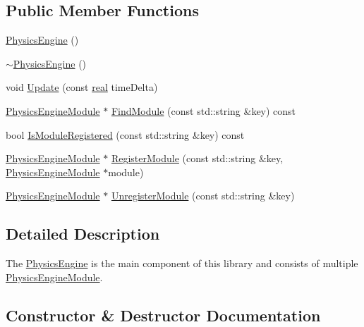 \subsection*{Public Member Functions}
\begin{DoxyCompactItemize}
\item 
\hyperlink{classrum_1_1_physics_engine_a9085eaf9e3fc5f840dbc10c1574028a4}{Physics\+Engine} ()
\item 
\hyperlink{classrum_1_1_physics_engine_ad88a3f6114a8851c682de8b3c09c8da8}{$\sim$\+Physics\+Engine} ()
\item 
void \hyperlink{classrum_1_1_physics_engine_af48e5bd066198391bd5c7284b51a6633}{Update} (const \hyperlink{namespacerum_a7e8cca23573d5eaead0f138cbaa4862c}{real} time\+Delta)
\item 
\hyperlink{classrum_1_1_physics_engine_module}{Physics\+Engine\+Module} $\ast$ \hyperlink{classrum_1_1_physics_engine_a2cb5a92d621c50d89764b93fbabcb2bd}{Find\+Module} (const std\+::string \&key) const
\item 
bool \hyperlink{classrum_1_1_physics_engine_a625ab8e7b852ad91d97df5600bfd32a2}{Is\+Module\+Registered} (const std\+::string \&key) const
\item 
\hyperlink{classrum_1_1_physics_engine_module}{Physics\+Engine\+Module} $\ast$ \hyperlink{classrum_1_1_physics_engine_ac8e1bad8e3f99070fa79be045ff40463}{Register\+Module} (const std\+::string \&key, \hyperlink{classrum_1_1_physics_engine_module}{Physics\+Engine\+Module} $\ast$module)
\item 
\hyperlink{classrum_1_1_physics_engine_module}{Physics\+Engine\+Module} $\ast$ \hyperlink{classrum_1_1_physics_engine_a1ea5fff27011701817f5acabb69e072c}{Unregister\+Module} (const std\+::string \&key)
\end{DoxyCompactItemize}


\subsection{Detailed Description}
The \hyperlink{classrum_1_1_physics_engine}{Physics\+Engine} is the main component of this library and consists of multiple \hyperlink{classrum_1_1_physics_engine_module}{Physics\+Engine\+Module}. 

\subsection{Constructor \& Destructor Documentation}
\mbox{\label{classrum_1_1_physics_engine_a9085eaf9e3fc5f840dbc10c1574028a4}} 
